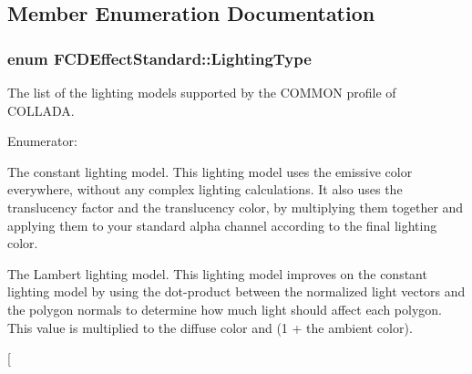 \subsection{Member Enumeration Documentation}
\hypertarget{classFCDEffectStandard_a0c8ec2fb06ea05212a4bb140f909b41d}{
\subsubsection[{LightingType}]{\setlength{\rightskip}{0pt plus 5cm}enum {\bf FCDEffectStandard::LightingType}}}
\label{classFCDEffectStandard_a0c8ec2fb06ea05212a4bb140f909b41d}
The list of the lighting models supported by the COMMON profile of COLLADA. \begin{Desc}
\item[Enumerator: ]\par
\begin{description}
\item[{\em 
\hypertarget{classFCDEffectStandard_a0c8ec2fb06ea05212a4bb140f909b41da405f6b6e4e09f73969b9566ec39a37cd}{
CONSTANT}
\label{classFCDEffectStandard_a0c8ec2fb06ea05212a4bb140f909b41da405f6b6e4e09f73969b9566ec39a37cd}
}]The constant lighting model. This lighting model uses the emissive color everywhere, without any complex lighting calculations. It also uses the translucency factor and the translucency color, by multiplying them together and applying them to your standard alpha channel according to the final lighting color. \item[{\em 
\hypertarget{classFCDEffectStandard_a0c8ec2fb06ea05212a4bb140f909b41da936fa2b549fcc7833ec86e32a6d26667}{
LAMBERT}
\label{classFCDEffectStandard_a0c8ec2fb06ea05212a4bb140f909b41da936fa2b549fcc7833ec86e32a6d26667}
}]The Lambert lighting model. This lighting model improves on the constant lighting model by using the dot-\/product between the normalized light vectors and the polygon normals to determine how much light should affect each polygon. This value is multiplied to the diffuse color and (1 + the ambient color). \item[{\em 
}
\end{description}
\end{Desc}
